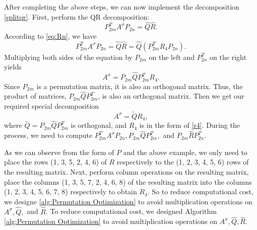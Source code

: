 \documentclass[conference]{IEEEtran}
\numberwithin{equation}{section}
\begin{document}
After completing the above steps, we can now  implement the decomposition \eqref{splitqr}.
First, perform the QR decomposition:
\[P_{2m}^TA^\sigma P_{2n} = \widehat{Q}\widehat{R}.\]
According to \eqref{eq:Rn}, we have
\[P_{2m}^TA^\sigma P_{2n} = \widehat{Q}\widehat{R} = \widehat{Q}(P_{2m}^TR_4P_{2n}).\]
Multiplying both sides of the equation by $P_{2m}$ on the left and $P_{2n}^T$ on the right yields
\[A^\sigma=P_{2m}\widehat{Q}P_{2m}^T R_4.\]
 Since $P_{2m}$ is a permutation matrix, it is also an orthogonal matrix. Thus, the product of matrices, $P_{2m}\widehat{Q}P_{2m}^T$, is also an orthogonal matrix. Then we get our required special decomposition \[A^\sigma=\widetilde{Q}R_4,\] where $\widetilde{Q}=P_{2m}\widehat{Q}P_{2m}^T$ is orthogonal, and $R_4$ is in the form of \eqref{r4}. During the process, we need to compute 
$P_{2m}^TA^\sigma P_{2n}, P_{2m}\widehat{Q}P_{2m}^T,$ and $ P_{2m} \widehat{R}P_{2n}^T$. 

As we can observe from the form of $P$ and the above example, we only need to place the rows (1, 3, 5, 2, 4, 6) of $R$ respectively to the (1, 2, 3, 4, 5, 6) rows of the resulting matrix. Next, perform column operations on the resulting matrix, place the columns (1, 3, 5, 7, 2, 4, 6, 8) of the resulting matrix into the columns (1, 2, 3, 4, 5, 6, 7, 8) respectively to obtain $R_4$.
 So to reduce computational cost, we designe \cref{alg:Permutation Optimization} to avoid multiplication operations on $A^\sigma, \widehat{Q}, $ and $ \widehat{R}$.
\iffalse
To reduce computational cost, we designed Algorithm \cref{alg:Permutation Optimization} to avoid multiplication operations on $A^\sigma, \widehat{Q}, \widehat{R}$.
\end{document}

